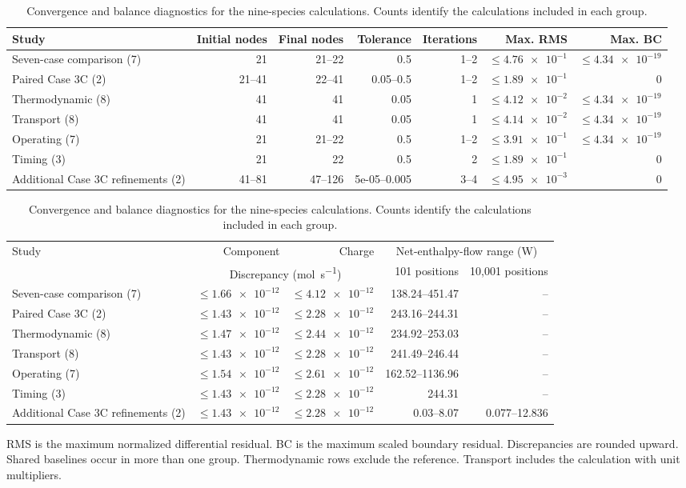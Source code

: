 \begin{table}[pos=t]
\centering\footnotesize
\caption{Convergence and balance diagnostics for the nine-species calculations. Counts identify the calculations included in each group.}
\label{tab:run-diagnostics}
\setlength{\tabcolsep}{4pt}
\begin{tabularx}{\textwidth}{@{}Xrrrrrr@{}}
\toprule
Study & Initial nodes & Final nodes & Tolerance & Iterations & Max. RMS & Max. BC \\
\midrule
Seven-case comparison (7) & 21 & 21--22 & 0.5 & 1--2 & $\leq\num{4.76e-1}$ & $\leq\num{4.34e-19}$ \\
Paired Case 3C (2) & 21--41 & 22--41 & 0.05--0.5 & 1--2 & $\leq\num{1.89e-1}$ & 0 \\
Thermodynamic (8) & 41 & 41 & 0.05 & 1 & $\leq\num{4.12e-2}$ & $\leq\num{4.34e-19}$ \\
Transport (8) & 41 & 41 & 0.05 & 1 & $\leq\num{4.14e-2}$ & $\leq\num{4.34e-19}$ \\
Operating (7) & 21 & 21--22 & 0.5 & 1--2 & $\leq\num{3.91e-1}$ & $\leq\num{4.34e-19}$ \\
Timing (3) & 21 & 22 & 0.5 & 2 & $\leq\num{1.89e-1}$ & 0 \\
Additional Case 3C refinements (2) & 41--81 & 47--126 & 5e-05--0.005 & 3--4 & $\leq\num{4.95e-3}$ & 0 \\
\bottomrule
\end{tabularx}
\par\medskip
\begin{tabularx}{\textwidth}{@{}Xrrrr@{}}
\toprule
Study & Component & Charge & \multicolumn{2}{c}{Net-enthalpy-flow range (\unit{W})} \\
 & \multicolumn{2}{c}{Discrepancy (\unit{mol.s^{-1}})} & 101 positions & 10,001 positions \\
\midrule
Seven-case comparison (7) & $\leq\num{1.66e-12}$ & $\leq\num{4.12e-12}$ & 138.24--451.47 & -- \\
Paired Case 3C (2) & $\leq\num{1.43e-12}$ & $\leq\num{2.28e-12}$ & 243.16--244.31 & -- \\
Thermodynamic (8) & $\leq\num{1.47e-12}$ & $\leq\num{2.44e-12}$ & 234.92--253.03 & -- \\
Transport (8) & $\leq\num{1.43e-12}$ & $\leq\num{2.28e-12}$ & 241.49--246.44 & -- \\
Operating (7) & $\leq\num{1.54e-12}$ & $\leq\num{2.61e-12}$ & 162.52--1136.96 & -- \\
Timing (3) & $\leq\num{1.43e-12}$ & $\leq\num{2.28e-12}$ & 244.31 & -- \\
Additional Case 3C refinements (2) & $\leq\num{1.43e-12}$ & $\leq\num{2.28e-12}$ & 0.03--8.07 & 0.077--12.836 \\
\bottomrule
\end{tabularx}
\par\smallskip
\begin{minipage}{\textwidth}\footnotesize
RMS is the maximum normalized differential residual. BC is the maximum scaled boundary residual. Discrepancies are rounded upward. Shared baselines occur in more than one group. Thermodynamic rows exclude the reference. Transport includes the calculation with unit multipliers.
\end{minipage}
\end{table}
